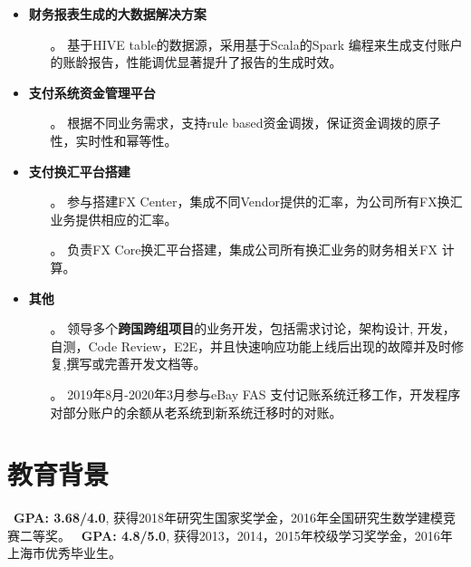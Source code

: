 \documentclass{resume}
\begin{document}
\begin{itemize}
  \item \textbf{财务报表生成的大数据解决方案}
  \begin{itemize}
    \item[。] 基于HIVE table的数据源，采用基于Scala的Spark 编程来生成支付账户的账龄报告，性能调优显著提升了报告的生成时效。
  \end{itemize}
  \item \textbf{支付系统资金管理平台}
  \begin{itemize}
    \item[。] 根据不同业务需求，支持rule based资金调拨，保证资金调拨的原子性，实时性和幂等性。
  \end{itemize}
  \item \textbf{支付换汇平台搭建}
  \begin{itemize}
    \item[。] 参与搭建FX Center，集成不同Vendor提供的汇率，为公司所有FX换汇业务提供相应的汇率。
    \item[。] 负责FX Core换汇平台搭建，集成公司所有换汇业务的财务相关FX 计算。
  \end{itemize}
  \item \textbf{其他}
  \begin{itemize}
    \item[。] 领导多个\textbf{跨国跨组项目}的业务开发，包括需求讨论，架构设计, 开发，自测，Code Review，E2E，并且快速响应功能上线后出现的故障并及时修复,撰写或完善开发文档等。
    \item[。] 2019年8月-2020年3月参与eBay FAS 支付记账系统迁移工作，开发程序对部分账户的余额从老系统到新系统迁移时的对账。
  \end{itemize}
\end{itemize}


\section{教育背景}
\ \textbf{GPA: 3.68/4.0}, 获得2018年研究生国家奖学金，2016年全国研究生数学建模竞赛二等奖。
\ \textbf{GPA: 4.8/5.0}, 获得2013，2014，2015年校级学习奖学金，2016年上海市优秀毕业生。
\end{document}
